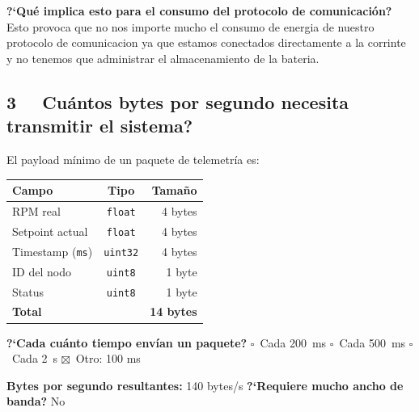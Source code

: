 \documentclass[11pt, letterpaper]{article}
\begin{document}
\textbf{?`Qu\'e implica esto para el consumo del protocolo de comunicaci\'on?}
Esto provoca que no nos importe mucho el consumo de energia de nuestro protocolo de comunicacion ya que estamos conectados directamente a la corrinte y no tenemos que administrar el almacenamiento de la bateria.

\subsection{%
  \texorpdfstring{%
    \textcolor{roseMain}{3}~~%
    \textquestiondown Cu\'antos bytes por segundo necesita transmitir el sistema?%
  }{Pregunta 3}%
}

El payload m\'inimo de un paquete de telemetr\'ia es:

\begin{center}
\begin{tabular}{lcr}
  \toprule
  \textbf{Campo}          & \textbf{Tipo}    & \textbf{Tama\~no} \\
  \midrule
  RPM real                & \texttt{float}   & 4 bytes \\
  Setpoint actual         & \texttt{float}   & 4 bytes \\
  Timestamp (\texttt{ms}) & \texttt{uint32}  & 4 bytes \\
  ID del nodo             & \texttt{uint8}   & 1 byte  \\
  Status                  & \texttt{uint8}   & 1 byte  \\
  \midrule
  \textbf{Total}          &                  & \textbf{14 bytes}\\
  \bottomrule
\end{tabular}
\end{center}

\vspace{0.3cm}

\textbf{?`Cada cu\'anto tiempo env\'ian un paquete?}
\hspace{0.5cm}
$\square$~Cada 200~ms \quad
$\square$~Cada 500~ms \quad
$\square$~Cada 2~s \quad
$\boxtimes$~Otro: 100 ms

\vspace{0.3cm}

\textbf{Bytes por segundo resultantes:} 140 bytes/s
\hspace{0.5cm}
\textbf{?`Requiere mucho ancho de banda?} No
\end{document}
